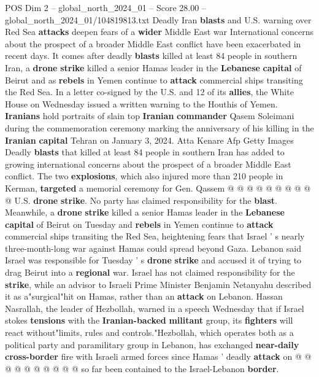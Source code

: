 \begin{textsample}{POS Dim 2 – global\_north\_2024\_01 – Score 28.00 – global\_north\_2024\_01/104819813.txt}  \label{ex:f2_pos_107}
Deadly Iran \textbf{blasts} and U.S. warning over Red Sea \textbf{attacks} deepen fears of a \textbf{wider} Middle East war International concerns about the prospect of a broader Middle East conflict have been exacerbated in recent days.
It comes after deadly \textbf{blasts} killed at least 84 people in southern Iran, a \textbf{drone} \textbf{strike} killed a senior Hamas leader in the \textbf{Lebanese} \textbf{capital} of Beirut and as \textbf{rebels} in Yemen continue to \textbf{attack} commercial ships transiting the Red Sea.
In a letter co-signed by the U.S. and 12 of its \textbf{allies}, the White House on Wednesday issued a written warning to the Houthis of Yemen. \textbf{Iranians} hold portraits of slain top \textbf{Iranian} \textbf{commander} Qasem Soleimani during the commemoration ceremony marking the anniversary of his killing in the \textbf{Iranian} \textbf{capital} Tehran on January 3, 2024.
Atta Kenare Afp Getty Images Deadly \textbf{blasts} that killed at least 84 people in southern Iran has added to growing international concerns about the prospect of a broader Middle East conflict.
The two \textbf{explosions}, which also injured more than 210 people in Kerman, \textbf{targeted} a memorial ceremony for Gen.
Qassem @ @ @ @ @ @ @ @ @ @ U.S. \textbf{drone} \textbf{strike}.
No party has claimed responsibility for the \textbf{blast}.
Meanwhile, a \textbf{drone} \textbf{strike} killed a senior Hamas leader in the \textbf{Lebanese} \textbf{capital} of Beirut on Tuesday and \textbf{rebels} in Yemen continue to \textbf{attack} commercial ships transiting the Red Sea, heightening fears that Israel ' s nearly three-month-long war against Hamas could spread beyond Gaza.
Lebanon said Israel was responsible for Tuesday ' s \textbf{drone} \textbf{strike} and accused it of trying to drag Beirut into a \textbf{regional} war.
Israel has not claimed responsibility for the \textbf{strike}, while an advisor to Israeli Prime Minister Benjamin Netanyahu described it as a"surgical"hit on Hamas, rather than an \textbf{attack} on Lebanon.
Hassan Nasrallah, the leader of Hezbollah, warned in a speech Wednesday that if Israel stokes \textbf{tensions} with the \textbf{Iranian-backed} \textbf{militant} group, its \textbf{fighters} will react without"limits, rules and controls."Hezbollah, which operates both as a political party and paramilitary group in Lebanon, has exchanged \textbf{near-daily} \textbf{cross-border} fire with Israeli armed forces since Hamas ' deadly \textbf{attack} on @ @ @ @ @ @ @ @ @ @ so far been contained to the Israel-Lebanon \textbf{border}.

\end{textsample}
